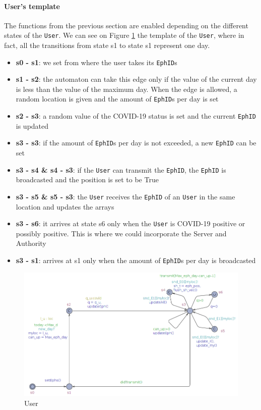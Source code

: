 \documentclass[a4paper, twocolumn]{article}
\begin{document}
\paragraph{User's template}
The functions from the previous section are enabled depending on the different states of the \texttt{User}. We can see on Figure \ref{fig:user} the template of the \texttt{User}, where in fact, all the transitions from state s1 to state s1 represent one day.
\begin{itemize}
    \item \textbf{s0 - s1}: we set from where the user takes its \texttt{EphID}s
    \item \textbf{s1 - s2}: the automaton can take this edge only if the value of the current day is less than the value of the maximum day. When the edge is allowed, a random location is given and the amount of \texttt{EphID}s per day is set
    \item \textbf{s2 - s3}: a random value of the COVID-19 status is set and the current \texttt{EphID} is updated
    \item \textbf{s3 - s3}: if the amount of \texttt{EphID}s per day is not exceeded, a new \texttt{EphID} can be set
    \item \textbf{s3 - s4 \& s4 - s3}: if the \texttt{User} can transmit the \texttt{EphID}, the \texttt{EphID} is broadcasted and the position is set to be True
    \item \textbf{s3 - s5 \& s5 - s3}: the \texttt{User} receives the \texttt{EphID} of an \texttt{User} in the same location and updates the arrays
    \item \textbf{s3 - s6}: it arrives at state s6 only when the \texttt{User} is COVID-19 positive or possibly positive. This is where we could incorporate the Server and Authority
    \item \textbf{s3 - s1}: arrives at s1 only when the amount of \texttt{EphID}s per day is broadcasted
\end{itemize}
\begin{figure}[H]
    \centering
    \includegraphics[scale=0.25]{images/user.png}
    \caption{User}
    \label{fig:user} 
\end{figure}
\end{document}
